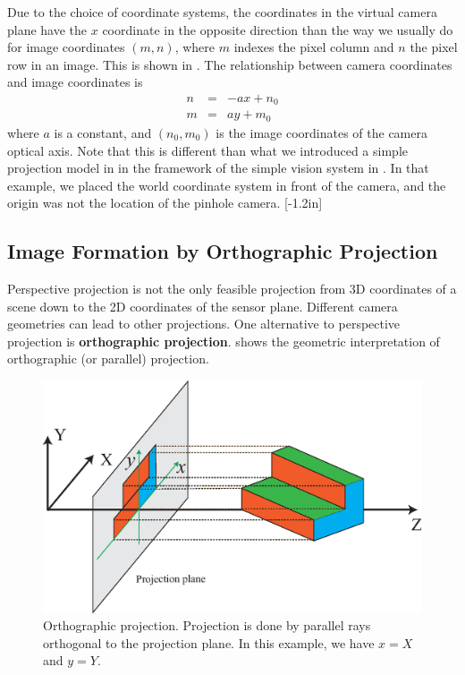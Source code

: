 Due to the choice of coordinate systems, the coordinates in the virtual camera plane have the $x$ coordinate in the opposite direction than the way we usually do for image coordinates $(m,n)$, where $m$ indexes the pixel column and $n$ the pixel row in an image. This is shown in . The relationship between camera coordinates and image coordinates is
\begin{eqnarray}
n & = & - a x + n_0\\
m & = & a y + m_0
\label{eq:cameratoimagecoordinates}
\end{eqnarray}
where $a$ is a constant, and $(n_0, m_0)$ is the image coordinates of the camera optical axis. Note that this is different than what we introduced a simple projection model in \fig{\ref{fig:projection}} in the framework of the simple vision system in \chap{\ref{chapter:simplesystem}}. In that example, we placed the world coordinate system in front of the camera, and the origin was not the location of the pinhole camera.
[-1.2in]


\subsection{Image Formation by Orthographic Projection}

Perspective projection is not the only feasible projection from 3D
coordinates of a scene
down to the 2D coordinates of the sensor plane.  Different camera geometries can lead to other projections.  One alternative to perspective projection is {\bf orthographic projection}. \Fig{\ref{fig:orthographics}} shows the geometric interpretation of orthographic (or parallel) projection. 


\begin{figure}[t]
\centerline{
\includegraphics[width=.9\linewidth]{figures/imaging/orthogonal_projection.eps}
}
\caption{Orthographic projection. Projection is done by parallel rays orthogonal to the projection plane. In this example, we have $x = X$ and $y = Y$.}
\label{fig:orthographics}
\end{figure}

